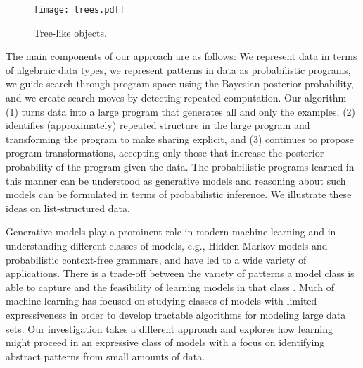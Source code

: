 \documentclass[a4paper,10pt]{article}
\begin{document}
\begin{figure}[b]
\begin{center}
\texttt{[image: trees.pdf]}
\end{center}
\caption{Tree-like objects.}
\label{fig:plants}
\end{figure}



The main components of our approach are as follows: We represent data in terms of algebraic data types, we represent patterns in data as probabilistic programs, we guide search through program space using the Bayesian posterior probability, and we create search moves by detecting repeated computation. Our algorithm 
(1) turns data into a large program that generates all and only the examples,
(2) identifies (approximately) repeated structure in the large program and transforming the program to make sharing explicit, and   %
(3) continues to propose program transformations, accepting only those that increase the posterior probability of the program given the data.  
The probabilistic programs learned in this manner can be understood as generative models and reasoning about such models can be formulated in terms of probabilistic inference. We illustrate these ideas on list-structured data.

Generative models play a prominent role in modern machine learning and in understanding different classes of models, e.g., Hidden Markov models and probabilistic context-free grammars, and have led to a wide variety of applications.  There is a trade-off between the variety of patterns a model class is able to capture and the feasibility of learning models in that class \cite{Russell2003}.  Much of machine learning has focused on studying classes of models with limited expressiveness in order to develop tractable algorithms for modeling large data sets.  Our investigation takes a different approach and explores how learning might proceed in an expressive class of models with a focus on identifying abstract patterns from small amounts of data.
\end{document}
